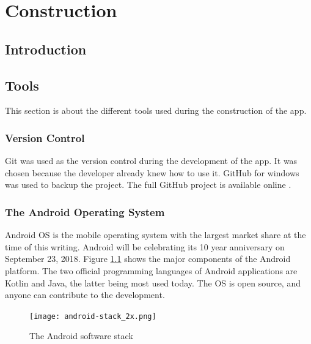 
\chapter{Construction} %
\label{Chapter3}

\section{Introduction}

\cite  {SoftwE}

\section{Tools}
This section is about the different tools used during the construction of the app.

\subsection{Version Control}\label{verCon}
Git was used as the version control during the development of the app. It was chosen because the developer already knew how to use it. GitHub for windows was used to backup the project. The full GitHub project is available online \cite{detemegandy}.
 
\subsection{The Android Operating System }
Android {OS} is the mobile operating system with the largest market share at the time of this writing\cite{gartner}. Android will be celebrating its 10 year anniversary on September 23, 2018\cite{android_developers_blog_2008}. Figure \ref{android-stack} shows the major components of the Android platform. The two official programming languages of Android applications are Kotlin and Java, the latter being most used today. The OS is open source, and anyone can contribute to the development\cite{android_open_source_project}.

\begin{figure}[!htb]
 \centering
 \texttt{[image: android-stack\_2x.png]}
 \caption{The Android software stack \label{android-stack} \cite{android_developers_2018}}
\end{figure}

